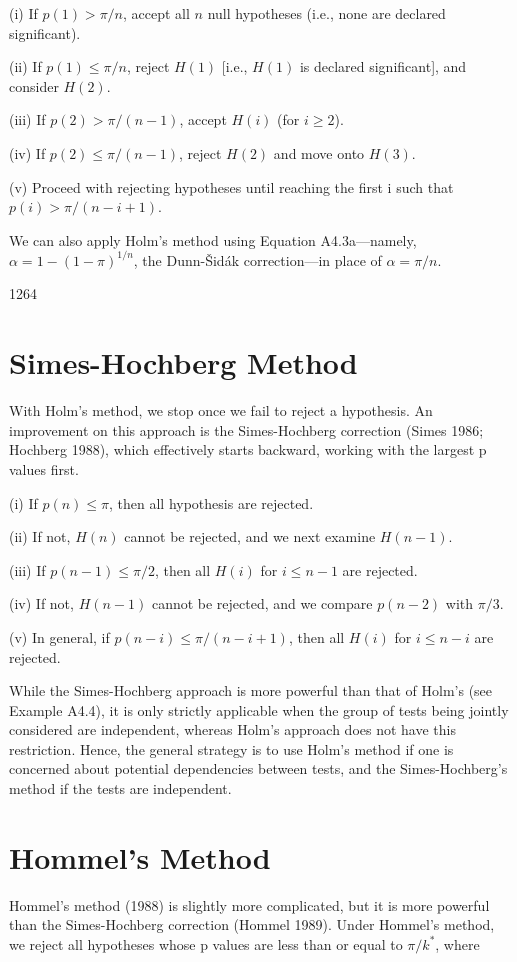 \documentclass{article}
\begin{document}
(i) If  $ p(1) > \pi/n $, accept all  $ n $ null hypotheses (i.e., none are declared significant).

(ii) If  $ p(1) \leq \pi/n $, reject  $ H(1) $ [i.e.,  $ H(1) $ is declared significant], and consider  $ H(2) $.

(iii) If  $ p(2) > \pi/(n - 1) $, accept  $ H(i) $ (for  $ i \geq 2 $).

(iv) If  $ p(2) \leq \pi/(n-1) $, reject  $ H(2) $ and move onto  $ H(3) $.

(v) Proceed with rejecting hypotheses until reaching the first i such that  $ p(i) > \pi/(n - i + 1) $.

We can also apply Holm’s method using Equation A4.3a—namely,  $ \alpha = 1 - (1 - \pi)^{1/n} $, the Dunn-Šidák correction—in place of  $ \alpha = \pi/n $.

1264

\section{Simes-Hochberg Method}
With Holm's method, we stop once we fail to reject a hypothesis. An improvement on this approach is the Simes-Hochberg correction (Simes 1986; Hochberg 1988), which effectively starts backward, working with the largest p values first.

(i) If  $ p(n) \leq \pi $, then all hypothesis are rejected.

(ii) If not,  $ H(n) $ cannot be rejected, and we next examine  $ H(n-1) $.

(iii) If  $ p(n-1) \leq \pi/2 $, then all  $ H(i) $ for  $ i \leq n-1 $ are rejected.

(iv) If not,  $ H(n-1) $ cannot be rejected, and we compare  $ p(n-2) $ with  $ \pi/3 $.

(v) In general, if  $ p(n - i) \leq \pi/(n - i + 1) $, then all  $ H(i) $ for  $ i \leq n - i $ are rejected.

While the Simes-Hochberg approach is more powerful than that of Holm's (see Example A4.4), it is only strictly applicable when the group of tests being jointly considered are independent, whereas Holm's approach does not have this restriction. Hence, the general strategy is to use Holm's method if one is concerned about potential dependencies between tests, and the Simes-Hochberg's method if the tests are independent.

\section{Hommel's Method}
Hommel's method (1988) is slightly more complicated, but it is more powerful than the Simes-Hochberg correction (Hommel 1989). Under Hommel's method, we reject all hypotheses whose p values are less than or equal to  $ \pi/k^{*} $, where
\end{document}
